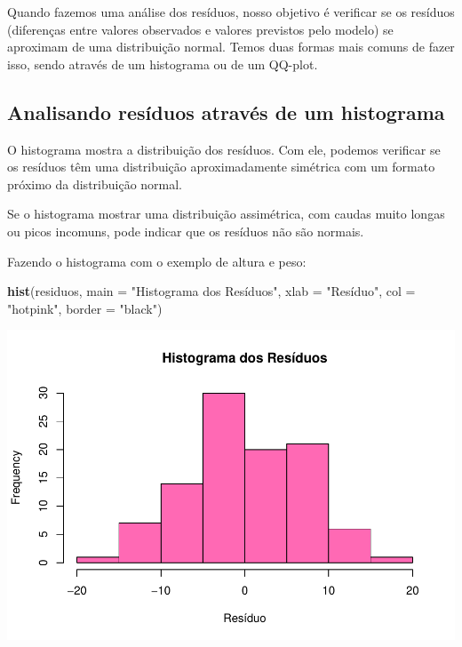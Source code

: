 \documentclass[
]{book}
\newenvironment{Shaded}{\begin{snugshade}}{\end{snugshade}}
\newcommand{\AttributeTok}[1]{\textcolor[rgb]{0.13,0.29,0.53}{#1}}
\newcommand{\FunctionTok}[1]{\textcolor[rgb]{0.13,0.29,0.53}{\textbf{#1}}}
\newcommand{\NormalTok}[1]{#1}
\newcommand{\StringTok}[1]{\textcolor[rgb]{0.31,0.60,0.02}{#1}}
\begin{document}
Quando fazemos uma análise dos resíduos, nosso objetivo é verificar se os resíduos (diferenças entre valores observados e valores previstos pelo modelo) se aproximam de uma distribuição normal. Temos duas formas mais comuns de fazer isso, sendo através de um histograma ou de um QQ-plot.

\subsection{Analisando resíduos através de um histograma}\label{analisando-resuxedduos-atravuxe9s-de-um-histograma}

O histograma mostra a distribuição dos resíduos. Com ele, podemos verificar se os resíduos têm uma distribuição aproximadamente simétrica com um formato próximo da distribuição normal.

Se o histograma mostrar uma distribuição assimétrica, com caudas muito longas ou picos incomuns, pode indicar que os resíduos não são normais.

Fazendo o histograma com o exemplo de altura e peso:

\begin{Shaded}
\begin{Highlighting}[]
\FunctionTok{hist}\NormalTok{(residuos, }
     \AttributeTok{main =} \StringTok{"Histograma dos Resíduos"}\NormalTok{, }
     \AttributeTok{xlab =} \StringTok{"Resíduo"}\NormalTok{, }
     \AttributeTok{col =} \StringTok{"hotpink"}\NormalTok{, }
     \AttributeTok{border =} \StringTok{"black"}\NormalTok{)}
\end{Highlighting}
\end{Shaded}

\begin{center}\includegraphics{AED_files/figure-latex/hist_residuos-1} \end{center}
\end{document}

